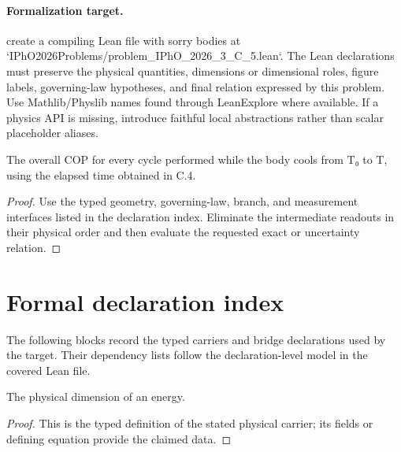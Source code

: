 \paragraph{Formalization target.}
create a compiling Lean file with sorry bodies at `IPhO2026Problems/problem\_IPhO\_2026\_3\_C\_5.lean`. The Lean declarations must preserve the physical quantities, dimensions or dimensional roles, figure labels, governing-law hypotheses, and final relation expressed by this problem.
Use Mathlib/Physlib names found through LeanExplore where available. If a physics API is missing, introduce faithful local abstractions rather than scalar placeholder aliases.

\begin{theorem}
  \label{thm:physics:IPhO_2026_3_C_5:target}
  The overall COP for every cycle performed while the body cools from T₀ to
  T, using the elapsed time obtained in C.4.
\end{theorem}
\begin{proof}
  Use the typed geometry, governing-law, branch, and measurement interfaces listed in the declaration index.  Eliminate the intermediate readouts in their physical order and then evaluate the requested exact or uncertainty relation.
\end{proof}
\section*{Formal declaration index}
The following blocks record the typed carriers and bridge declarations used by the target.  Their dependency lists follow the declaration-level model in the covered Lean file.

\begin{definition}
  \label{def:physics:IPhO_2026_3_C_5:aux001}
  The physical dimension of an energy.
\end{definition}
\begin{proof}
  This is the typed definition of the stated physical carrier; its fields or defining equation provide the claimed data.
\end{proof}

